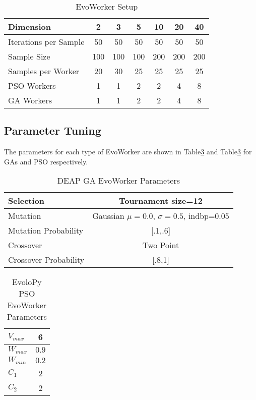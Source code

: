\documentclass[sigconf]{acmart}
\begin{document}
\begin{table}
  \small
  \caption{EvoWorker Setup}
  \label{tab:params} 
  \centering
  \small
  \begin{tabular}{|l|c|c|c|c|c|c|}
    \hline
    Dimension & 2 & 3 & 5 & 10 & 20 & 40\\ \hline
    Iterations per Sample  & 50 & 50 & 50 & 50 & 50 & 50\\ \hline
    Sample Size  & 100 & 100 & 100 & 200 & 200 & 200 \\ \hline
    Samples per Worker & 20 & 30 & 25 & 25 & 25 & 25  \\ \hline
    PSO Workers & 1 & 1 & 2 & 2 & 4 & 8  \\ \hline
    GA Workers & 1 & 1 & 2 & 2 & 4 & 8  \\ \hline
  \end{tabular}
\end{table}


\subsection{Parameter Tuning}
The parameters for each type of EvoWorker are shown in Table\ref{tab:GAparams}
and Table\ref{tab:GAparams} for GAs and PSO respectively.
\begin{table}
  \small
  \caption{ DEAP GA EvoWorker Parameters }
  \label{tab:GAparams} 
  \centering
  \small
  \begin{tabular}{|l|c|}
    \hline
    Selection & Tournament size=12\\ \hline
    Mutation & Gaussian $\mu=0.0$, $\sigma=0.5$, indbp=0.05  \\ \hline
    Mutation Probability & [.1,.6]  \\ \hline
    Crossover & Two Point  \\ \hline
    Crossover Probability& [.8,1]  \\ \hline
  \end{tabular}
\end{table}

\begin{table}
  \small
  \caption{ EvoloPy PSO EvoWorker Parameters }
  \label{tab:GAparams} 
  \centering
  \small
  \begin{tabular}{|l|c|}
    \hline
    $V_{max}$ & 6 \\ \hline
    $W_{max}$ & $0.9$ \\ \hline
    $W_{min}$ & $0.2$ \\ \hline
    $C_1$ & 2 \\ \hline
    $C_2$ & 2 \\ \hline
  \end{tabular}
\end{table}
\end{document}

